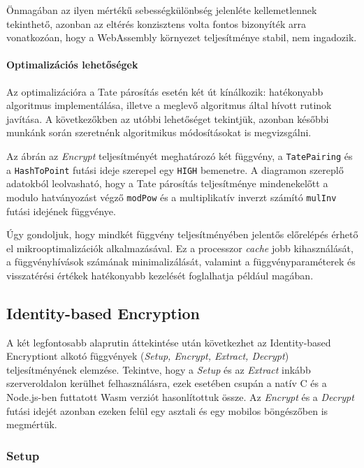Önmagában az ilyen mértékű sebességkülönbség jelenléte kellemetlennek tekinthető, azonban az eltérés konzisztens volta fontos bizonyíték arra vonatkozóan, hogy a WebAssembly környezet teljesítménye stabil, nem ingadozik.

\paragraph{Optimalizációs lehetőségek}

Az optimalizációra a Tate párosítás esetén két út kínálkozik: hatékonyabb algoritmus implementálása, illetve a meglevő algoritmus által hívott rutinok javítása. A következőkben az utóbbi lehetőséget tekintjük, azonban későbbi munkánk során szeretnénk algoritmikus módosításokat is megvizsgálni.

Az  ábrán az \textit{Encrypt} teljesítményét meghatározó két függvény, a \texttt{TatePairing} \linebreak és a \texttt{HashToPoint} futási ideje szerepel egy \texttt{HIGH} bemenetre. A diagramon szereplő adatokból leolvasható, hogy a Tate párosítás teljesítménye mindenekelőtt a modulo hatványozást végző \texttt{modPow} és a multiplikatív inverzt számító \texttt{mulInv} futási idejének függvénye.

Úgy gondoljuk, hogy mindkét függvény teljesítményében jelentős előrelépés érhető el mikrooptimalizációk alkalmazásával. Ez a processzor \textit{cache} jobb kihasználását, a függvényhívások számának minimalizálását, valamint a függvényparaméterek és visszatérési értékek hatékonyabb kezelését foglalhatja például magában.

\subsection{Identity-based Encryption}

A két legfontosabb alaprutin áttekintése után következhet az Identity-based Encryptiont alkotó függvények (\textit{Setup, Encrypt, Extract, Decrypt}) teljesítményének elemzése. Tekintve, hogy a \textit{Setup} és az \textit{Extract} inkább szerveroldalon kerülhet felhasználásra, ezek esetében csupán a natív C és a Node.js-ben futtatott Wasm verziót hasonlítottuk össze. Az \textit{Encrypt} és a \textit{Decrypt} futási idejét azonban ezeken felül egy asztali és egy mobilos böngészőben is megmértük.

\subsubsection{Setup}

